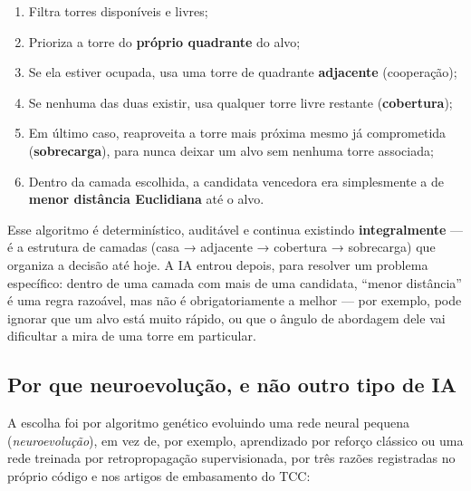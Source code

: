 \documentclass[11pt,a4paper]{article}
\begin{document}
\begin{enumerate}[leftmargin=1.4em]
  \item Filtra torres disponíveis e livres;
  \item Prioriza a torre do \textbf{próprio quadrante} do alvo;
  \item Se ela estiver ocupada, usa uma torre de quadrante \textbf{adjacente} (cooperação);
  \item Se nenhuma das duas existir, usa qualquer torre livre restante (\textbf{cobertura});
  \item Em último caso, reaproveita a torre mais próxima mesmo já comprometida
    (\textbf{sobrecarga}), para nunca deixar um alvo sem nenhuma torre associada;
  \item Dentro da camada escolhida, a candidata vencedora era simplesmente a de \textbf{menor
    distância Euclidiana} até o alvo.
\end{enumerate}

Esse algoritmo é determinístico, auditável e continua existindo \textbf{integralmente} — é a
estrutura de camadas (casa → adjacente → cobertura → sobrecarga) que organiza a decisão até
hoje. A IA entrou depois, para resolver um problema específico: dentro de uma camada com mais de
uma candidata, ``menor distância'' é uma regra razoável, mas não é obrigatoriamente a melhor —
por exemplo, pode ignorar que um alvo está muito rápido, ou que o ângulo de abordagem dele vai
dificultar a mira de uma torre em particular.

\subsection{Por que neuroevolução, e não outro tipo de IA}

A escolha foi por algoritmo genético evoluindo uma rede neural pequena (\emph{neuroevolução}),
em vez de, por exemplo, aprendizado por reforço clássico ou uma rede treinada por
retropropagação supervisionada, por três razões registradas no próprio código e nos artigos de
embasamento do TCC:
\end{document}
